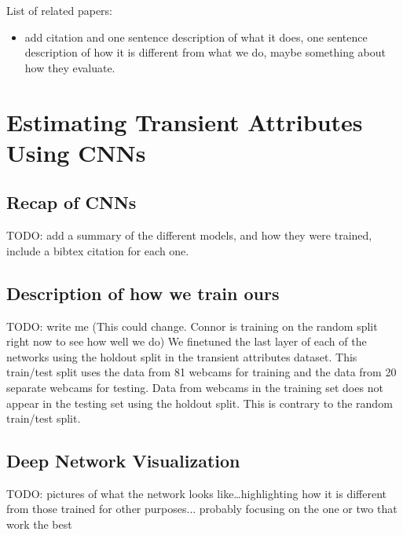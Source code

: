\documentclass{article}
\begin{document}
List of related papers:
\begin{itemize}

  \item add citation and one sentence description of what it does, one
    sentence description of how it is different from what we do, maybe
    something about how they evaluate.

\end{itemize}

\section{Estimating Transient Attributes Using CNNs}

\subsection{Recap of CNNs}

TODO: add a summary of the different models, and how they were
trained, include a bibtex citation for each one.

\subsection{Description of how we train ours}

TODO: write me\newline 
(This could change. Connor is training on the random split right now
to see how well we do)
\newline\indent
We finetuned the last layer of each of the networks using the holdout 
split in the transient attributes dataset.  This train/test split uses
the data from 81 webcams for training and the data from 20 separate 
webcams for testing.  Data from webcams in the training set does not
appear in the testing set using the holdout split.  This is contrary to 
the random train/test split.  

\subsection{Deep Network Visualization}

TODO: pictures of what the network looks like\dots highlighting how it
is different from those trained for other purposes... probably
focusing on the one or two that work the best
\end{document}
